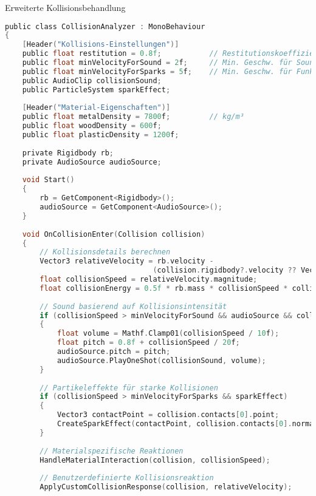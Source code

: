 \begin{code}{Erweiterte Kollisionsbehandlung}\\
\begin{lstlisting}[language=C, style=basesmol]
public class CollisionAnalyzer : MonoBehaviour 
{
    [Header("Kollisions-Einstellungen")]
    public float restitution = 0.8f;           // Restitutionskoeffizient
    public float minVelocityForSound = 2f;     // Min. Geschw. für Sound
    public float minVelocityForSparks = 5f;    // Min. Geschw. für Funken
    public AudioClip collisionSound;
    public ParticleSystem sparkEffect;
    
    [Header("Material-Eigenschaften")]
    public float metalDensity = 7800f;         // kg/m³
    public float woodDensity = 600f;
    public float plasticDensity = 1200f;
    
    private Rigidbody rb;
    private AudioSource audioSource;
    
    void Start() 
    {
        rb = GetComponent<Rigidbody>();
        audioSource = GetComponent<AudioSource>();
    }
    
    void OnCollisionEnter(Collision collision) 
    {
        // Kollisionsdetails berechnen
        Vector3 relativeVelocity = rb.velocity - 
                                  (collision.rigidbody?.velocity ?? Vector3.zero);
        float collisionSpeed = relativeVelocity.magnitude;
        float collisionEnergy = 0.5f * rb.mass * collisionSpeed * collisionSpeed;
        
        // Sound basierend auf Kollisionsintensität
        if (collisionSpeed > minVelocityForSound && audioSource && collisionSound) 
        {
            float volume = Mathf.Clamp01(collisionSpeed / 10f);
            float pitch = 0.8f + collisionSpeed / 20f;
            audioSource.pitch = pitch;
            audioSource.PlayOneShot(collisionSound, volume);
        }
        
        // Partikeleffekte für starke Kollisionen
        if (collisionSpeed > minVelocityForSparks && sparkEffect) 
        {
            Vector3 contactPoint = collision.contacts[0].point;
            CreateSparkEffect(contactPoint, collision.contacts[0].normal);
        }
        
        // Materialspezifische Reaktionen
        HandleMaterialInteraction(collision, collisionSpeed);
        
        // Benutzerdefinierte Kollisionsreaktion
        ApplyCustomCollisionResponse(collision, relativeVelocity);
        

\end{lstlisting}
\end{code}
